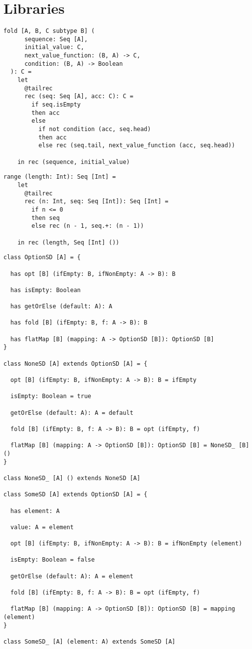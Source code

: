 \chapter{Libraries}

\begin{lstlisting}[label={lst:fold}]
  fold [A, B, C subtype B] (
      sequence: Seq [A],
      initial_value: C,
      next_value_function: (B, A) -> C,
      condition: (B, A) -> Boolean
  ): C =
    let
      @tailrec
      rec (seq: Seq [A], acc: C): C =
        if seq.isEmpty
        then acc
        else
          if not condition (acc, seq.head)
          then acc
          else rec (seq.tail, next_value_function (acc, seq.head))

    in rec (sequence, initial_value)
\end{lstlisting}

\begin{lstlisting}[label={lst:range}]
  range (length: Int): Seq [Int] =
    let
      @tailrec
      rec (n: Int, seq: Seq [Int]): Seq [Int] =
        if n <= 0
        then seq
        else rec (n - 1, seq.+: (n - 1))

    in rec (length, Seq [Int] ())
\end{lstlisting}


\begin{lstlisting}[label={lst:option}]
class OptionSD [A] = {

  has opt [B] (ifEmpty: B, ifNonEmpty: A -> B): B

  has isEmpty: Boolean

  has getOrElse (default: A): A

  has fold [B] (ifEmpty: B, f: A -> B): B

  has flatMap [B] (mapping: A -> OptionSD [B]): OptionSD [B]
}

class NoneSD [A] extends OptionSD [A] = {

  opt [B] (ifEmpty: B, ifNonEmpty: A -> B): B = ifEmpty

  isEmpty: Boolean = true

  getOrElse (default: A): A = default

  fold [B] (ifEmpty: B, f: A -> B): B = opt (ifEmpty, f)

  flatMap [B] (mapping: A -> OptionSD [B]): OptionSD [B] = NoneSD_ [B] ()
}

class NoneSD_ [A] () extends NoneSD [A]

class SomeSD [A] extends OptionSD [A] = {

  has element: A

  value: A = element

  opt [B] (ifEmpty: B, ifNonEmpty: A -> B): B = ifNonEmpty (element)

  isEmpty: Boolean = false

  getOrElse (default: A): A = element

  fold [B] (ifEmpty: B, f: A -> B): B = opt (ifEmpty, f)

  flatMap [B] (mapping: A -> OptionSD [B]): OptionSD [B] = mapping (element)
}

class SomeSD_ [A] (element: A) extends SomeSD [A]
\end{lstlisting}

